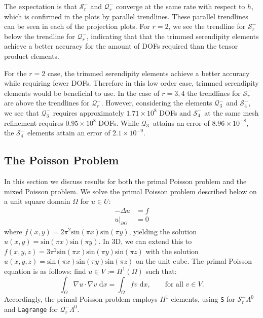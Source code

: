 \documentclass[format=acmsmall,screen,timestamp=false,a4paper]{acmart}
\newcommand\akg[1]{\textbf{\textcolor[rgb]{.5,0,1}{[Andrew: #1]}}}
\newcommand\josh[1]{\textbf{\textcolor[rgb]{0,.5,1}{[Josh: #1]}}}
\begin{document}
The expectation is that $\mathcal{S}^-_r$ and $\mathcal{Q}^-_r$ converge at the same rate with respect to $h$, which is confirmed in the plots by parallel trendlines.  These parallel trendlines can be seen in each of the projection plots.  For $r=2$, we see the trendline for $\mathcal{S}^-_r$ below the trendline for $\mathcal{Q}^-_r$, indicating that that the trimmed serendipity elements achieve a better accuracy for the amount of DOFs required than the tensor product elements.  

For the $r=2$ case, the trimmed serendipity elements achieve a better accuracy while requiring fewer DOFs.  Therefore in this low order case, trimmed serendipity elements would be beneficial to use.  In the case of $r=3,4$ the trendlines for $\mathcal{S}^-_r$ are above the trendlines for $\mathcal{Q}^-_r$.  However, considering the elements $\mathcal{Q}^-_3$ and $\mathcal{S}^-_4$, we see that $\mathcal{Q}^-_3$ requires approximately $1.71 \times 10^8$ DOFs and $\mathcal{S}^-_4$ at the same mesh refinement requires $0.95 \times 10^8$ DOFs.  While $\mathcal{Q}^-_3$ attains an error of $8.96 \times 10^{-8}$, the $\mathcal{S}^-_4$ elements attain an error of $2.1 \times 10^{-9}$.  


 



\subsection{The Poisson Problem}
In this section we discuss results for both the primal Poisson problem and the mixed Poisson problem.  We solve the primal Poisson problem described below on a unit square domain $\Omega$ for $u \in U$:
\begin{align*}
    -\Delta u &= f \\
    \displaystyle u\vert_{\partial \Omega} &= 0
\end{align*}
where $f(x,y) = 2\pi^2\text{sin}(\pi x)\text{sin}(\pi y) $, yielding the solution $u(x,y) = \text{sin}(\pi x)\text{sin}(\pi y)$. In 3D, we can extend this to $f(x,y,z) = 3\pi^2\text{sin}(\pi x)\text{sin}(\pi y)\text{sin}(\pi z)$ with the solution $u(x,y,z) = \text{sin}(\pi x)\text{sin}(\pi y)\text{sin}(\pi z)$ on the unit cube.  The primal Poisson equation is as follows: find $u \in V:= H^1(\Omega)$ such that:
\begin{equation*}
    \int_\Omega \nabla u \cdot \nabla v \text{ d}x = \int_\Omega f v \text{ d}x,\qquad \text{for all $v \in V$}.
\end{equation*}
Accordingly, the primal Poisson problem employs $H^1$ elements, using \texttt{S} for $\mathcal{S}^-_r \Lambda^0$ and \texttt{Lagrange} for $\mathcal{Q}^-_r \Lambda^0$. 
\end{document}

